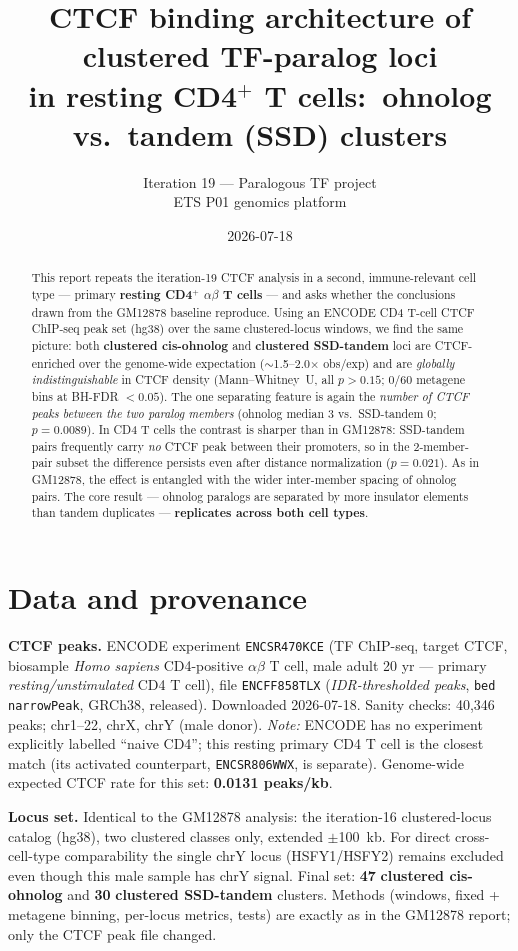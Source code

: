 \documentclass[11pt]{article}
\title{\textbf{CTCF binding architecture of clustered TF-paralog loci\\
in resting CD4$^+$ T cells:\ ohnolog vs.\ tandem (SSD) clusters}}
\author{Iteration 19 --- Paralogous TF project\\\small ETS P01 genomics platform}
\date{2026-07-18}
\newcommand{\ohno}{\textcolor{ohno}{\textbf{clustered cis-ohnolog}}}
\newcommand{\ssd}{\textcolor{ssd}{\textbf{clustered SSD-tandem}}}
\begin{document}
\maketitle

\begin{abstract}
\noindent This report repeats the iteration-19 CTCF analysis in a second, immune-relevant
cell type --- primary \textbf{resting CD4$^+$ $\alpha\beta$ T cells} --- and asks whether the
conclusions drawn from the GM12878 baseline reproduce. Using an ENCODE CD4 T-cell CTCF
ChIP-seq peak set (hg38) over the same clustered-locus windows, we find the same picture:
both \ohno{} and \ssd{} loci are CTCF-enriched over the genome-wide expectation
($\sim$1.5--2.0$\times$ obs/exp) and are \emph{globally indistinguishable} in CTCF density
(Mann--Whitney~U, all $p>0.15$; 0/60 metagene bins at BH-FDR $<0.05$). The one separating
feature is again the \emph{number of CTCF peaks between the two paralog members}
(ohnolog median 3 vs.\ SSD-tandem 0; $p=0.0089$). In CD4 T cells the contrast is sharper than
in GM12878: SSD-tandem pairs frequently carry \emph{no} CTCF peak between their promoters, so
in the 2-member-pair subset the difference persists even after distance normalization
($p=0.021$). As in GM12878, the effect is entangled with the wider inter-member spacing of
ohnolog pairs. The core result --- ohnolog paralogs are separated by more insulator elements
than tandem duplicates --- \textbf{replicates across both cell types}.
\end{abstract}

\section{Data and provenance}
\textbf{CTCF peaks.} ENCODE experiment \texttt{ENCSR470KCE} (TF ChIP-seq, target CTCF,
biosample \emph{Homo sapiens} CD4-positive $\alpha\beta$ T cell, male adult 20 yr ---
primary \emph{resting/unstimulated} CD4 T cell), file \texttt{ENCFF858TLX}
(\emph{IDR-thresholded peaks}, \texttt{bed narrowPeak}, GRCh38, released). Downloaded
2026-07-18. Sanity checks: 40{,}346 peaks; chr1--22, chrX, chrY (male donor).
\emph{Note:} ENCODE has no experiment explicitly labelled ``naive CD4''; this resting
primary CD4 T cell is the closest match (its activated counterpart, \texttt{ENCSR806WWX},
is separate). Genome-wide expected CTCF rate for this set: \textbf{0.0131 peaks/kb}.

\textbf{Locus set.} Identical to the GM12878 analysis: the iteration-16 clustered-locus
catalog (hg38), two clustered classes only, extended $\pm$100~kb. For direct
cross-cell-type comparability the single chrY locus (HSFY1/HSFY2) remains excluded even
though this male sample has chrY signal. Final set: \textbf{47} \ohno{} and \textbf{30}
\ssd{} clusters. Methods (windows, fixed + metagene binning, per-locus metrics, tests) are
exactly as in the GM12878 report; only the CTCF peak file changed.
\end{document}
